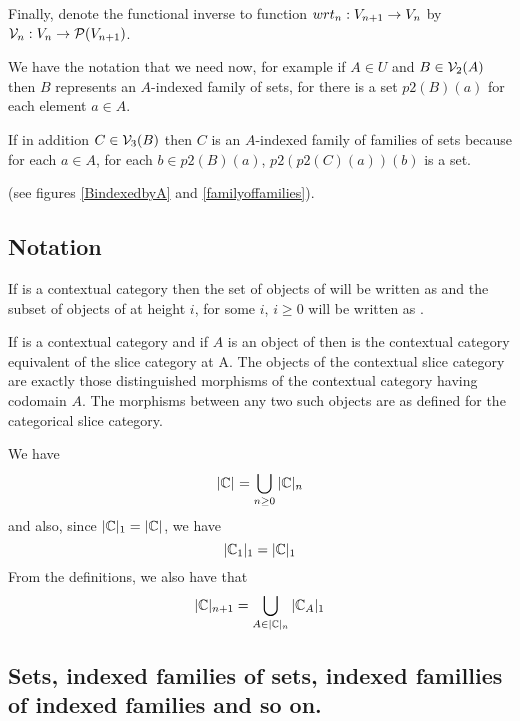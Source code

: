 \documentclass[10pt,a4paper]{scrartcl}
\begin{document}
Finally, denote the functional inverse to 
function $wrt_n: \varset[n+1] \morph \varset[n]$ by $\localvarsets_n :
\varset[n] \morph \powerset(\varset[n+1])$. 

We have the notation that we need now, for example if $A \in U$ and $B \in \localvarsets_2(A)$ then $B$ represents an $A$-indexed family of sets, for there is a set $p2(B)(a)$ for each element $a \in A$.

If in addition $C \in \localvarsets_3(B)$ then $C$ is  an $A$-indexed family of families of sets because for each $a \in A$,
for each $b \in p2(B)(a)$,
$p2(p2(C)(a))(b)$ is a set.

(see figures  \ref{BindexedbyA} and \ref{familyoffamilies}).
 
\subsection{Notation}
If \ccat[C] is a contextual category then the set of objects of \ccat[C]
will be written as  
and the subset of objects of \ccat[C] at height $i$, for some $i$, $i \geq 0$  will be written as .

\noindent
If \ccat[C] is a contextual category and if $A$ is an object of \ccat[C] then  is the contextual category equivalent of the slice category at A.
The objects of the contextual slice category  are exactly those distinguished morphisms of the contextual category \ccat[C] having codomain $A$.  The morphisms between any two such objects are as defined for the categorical slice category.

\noindent
\noindent
We have
\begin{equation}
\label{objectsall}
\cobj{C}=\bigcup_{n \geq 0}\cobj[n]{C}
\end{equation}
and also, since $\cobj[1]{C}=\cobj{C}$, we have
\begin{equation}
\label{objectsone}
\csliceobj[1]{C}{1}=\cobj[1]{C}
\end{equation}
From the definitions, we also have that
\begin{equation}
\label{objectssuccessor}
\cobj[n+1]{C}=\bigcup_{A \in \cobj[n]{C}}\csliceobj[1]{C}{A}
\end{equation}



\subsection{Sets, indexed families of sets, indexed famillies of indexed families and so on.}
\end{document}
